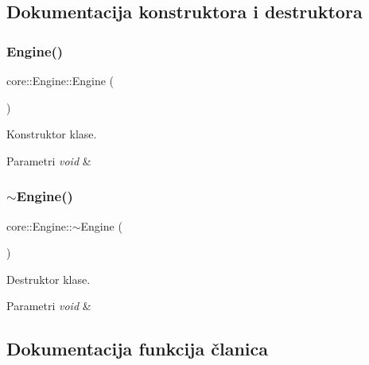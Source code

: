 \subsection{Dokumentacija konstruktora i destruktora}
\mbox{\label{classcore_1_1Engine_adcfd692be68f28117c7234ae09fd0824}} 
\subsubsection{\texorpdfstring{Engine()}{Engine()}}
{\footnotesize\ttfamily core\+::\+Engine\+::\+Engine (\begin{DoxyParamCaption}{ }\end{DoxyParamCaption})}



Konstruktor klase. 


\begin{DoxyParams}{Parametri}
{\em void} & \\
\hline
\end{DoxyParams}
\mbox{\label{classcore_1_1Engine_afadff2634c914c9f6c4ade95e78ff693}} 
\subsubsection{\texorpdfstring{$\sim$\+Engine()}{~Engine()}}
{\footnotesize\ttfamily core\+::\+Engine\+::$\sim$\+Engine (\begin{DoxyParamCaption}{ }\end{DoxyParamCaption})}



Destruktor klase. 


\begin{DoxyParams}{Parametri}
{\em void} & \\
\hline
\end{DoxyParams}


\subsection{Dokumentacija funkcija članica}
\mbox{\label{classcore_1_1Engine_ad6d0e175eff6ec04d3e5af53a78443ef}} 
